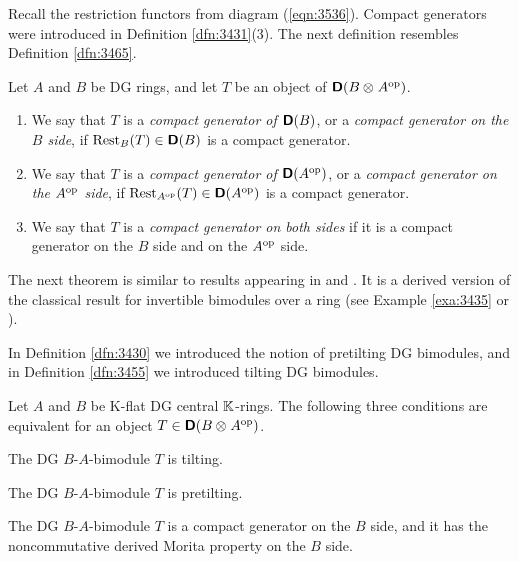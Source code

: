 Recall the restriction functors from diagram (\ref{eqn:3536}). 
Compact generators were introduced in Definition \ref{dfn:3431}(3). 
The next definition resembles Definition \lb \ref{dfn:3465}.

\begin{dfn} \label{3505} 
Let $A$ and $B$ be DG rings, and let $T$ be an object of 
$\boldsymbol{\mathsf{D}}(B \otimes_{} A^{\mathrm{op}})$.
\begin{enumerate}
\item We say that $T$ is a {\em compact generator of $\boldsymbol{\mathsf{D}}(B)$},
or a  {\em compact generator on the $B$ side}, 
if $\operatorname{Rest}_B(T) \in \boldsymbol{\mathsf{D}}(B)$ is a compact generator. 

\item We say that $T$ is a {\em compact generator of 
$\boldsymbol{\mathsf{D}}(A^{\mathrm{op}})$},
or a  {\em compact generator on the $A^{\mathrm{op}}$ side}, if 
$\operatorname{Rest}_{A^{\mathrm{op}}}(T) \in \boldsymbol{\mathsf{D}}(A^{\mathrm{op}})$ is a compact 
generator. 

\item We say that $T$ is a {\em compact generator on both sides}
if it is a compact generator on the $B$ side and on the $A^{\mathrm{op}}$ side.
\end{enumerate}
\end{dfn}

The next theorem is similar to results appearing in \cite{Ric2} and 
\cite{Kel2}. It is a derived version of the classical result for invertible 
bimodules over a ring (see Example \ref{exa:3435} or \cite[Section 4.1]{Row}). 

In Definition \ref{dfn:3430} we introduced the notion of pretilting DG 
bimodules, and in Definition \ref{dfn:3455} we introduced tilting DG bimodules. 

\begin{thm} \label{thm:3455}
Let $A$ and $B$ be K-flat DG central $\mathbb{K}$-rings. The following three 
conditions are equivalent for an object 
$T \in \boldsymbol{\mathsf{D}}(B \otimes_{} A^{\mathrm{op}})$. 
\begin{enumerate}
 The DG $B$-$A$-bimodule $T$ is tilting.

 The DG $B$-$A$-bimodule $T$ is pretilting.

 The DG $B$-$A$-bimodule $T$ is a compact generator on the 
$B$ side, and it has the noncommutative derived Morita property on the $B$ side.
\end{enumerate} 
\end{thm}

